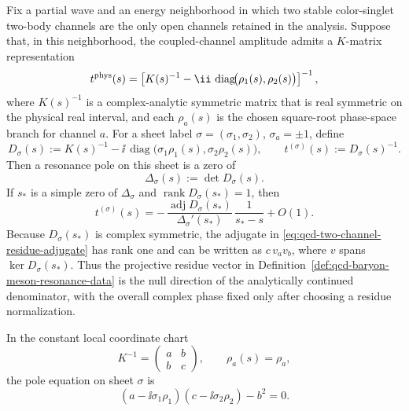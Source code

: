 \begin{proposition}
\label{prop:qcd-two-channel-sheet-residue}
Fix a partial wave and an energy neighborhood in which two stable
color-singlet two-body channels are the only open channels retained in the
analysis.  Suppose that, in this neighborhood, the coupled-channel amplitude
admits a \(K\)-matrix representation
\begin{equation}
  t^{\rm phys}(s)
  =
  \left[
    K(s)^{-1}
    -\ii\,\operatorname{diag}\!\bigl(\rho_1(s),\rho_2(s)\bigr)
  \right]^{-1},
  \label{eq:qcd-two-channel-physical-kmatrix}
\end{equation}
where \(K(s)^{-1}\) is a complex-analytic symmetric matrix that is real
symmetric on the physical real interval, and each \(\rho_a(s)\) is the
chosen square-root phase-space branch for channel \(a\).  For a sheet label
\(\sigma=(\sigma_1,\sigma_2)\), \(\sigma_a=\pm1\), define
\begin{equation}
  D_\sigma(s)
  :=
  K(s)^{-1}
  -\ii\,\operatorname{diag}\!\bigl(\sigma_1\rho_1(s),\sigma_2\rho_2(s)\bigr),
  \qquad
  t^{(\sigma)}(s):=D_\sigma(s)^{-1}.
  \label{eq:qcd-two-channel-sheet-denominator}
\end{equation}
Then a resonance pole on this sheet is a zero of
\begin{equation}
  \Delta_\sigma(s):=\det D_\sigma(s).
  \label{eq:qcd-two-channel-pole-determinant}
\end{equation}
If \(s_\ast\) is a simple zero of \(\Delta_\sigma\) and
\(\operatorname{rank}D_\sigma(s_\ast)=1\), then
\begin{equation}
  t^{(\sigma)}(s)
  =
  -\,\frac{\operatorname{adj}D_\sigma(s_\ast)}
          {\Delta_\sigma'(s_\ast)}\,
    \frac1{s_\ast-s}
  +O(1).
  \label{eq:qcd-two-channel-residue-adjugate}
\end{equation}
Because \(D_\sigma(s_\ast)\) is complex symmetric, the adjugate in
\eqref{eq:qcd-two-channel-residue-adjugate} has rank one and can be written
as \(c\,v_av_b\), where \(v\) spans
\(\ker D_\sigma(s_\ast)\).  Thus the projective residue vector in
Definition~\ref{def:qcd-baryon-meson-resonance-data} is the null direction of
the analytically continued denominator, with the overall complex phase fixed
only after choosing a residue normalization.

In the constant local coordinate chart
\[
  K^{-1}=
  \begin{pmatrix}a&b\\ b&c\end{pmatrix},
  \qquad
  \rho_a(s)=\rho_a,
\]
the pole equation on sheet \(\sigma\) is
\begin{equation}
  (a-\ii\sigma_1\rho_1)(c-\ii\sigma_2\rho_2)-b^2=0.
  \label{eq:qcd-two-channel-local-pole-equation}
\end{equation}
\end{proposition}

